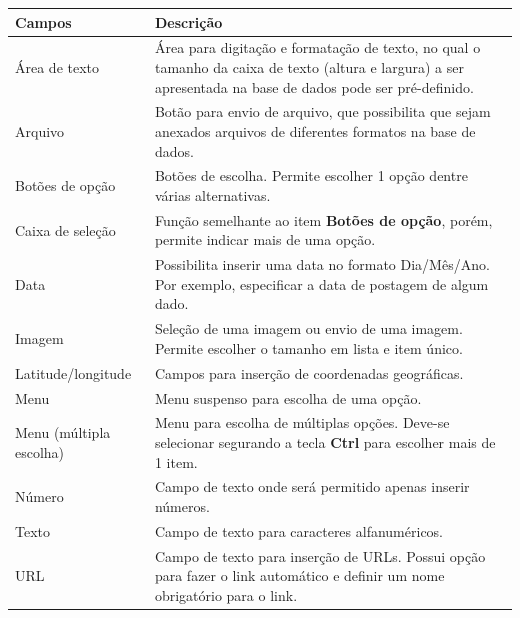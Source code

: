 \begin{longtable}{p{6cm}|p{9cm}}
   \hline
 \rowcolor[rgb]{0.8,0.8,0.8} \textbf{Campos} &  \textbf{Descrição}\\\hline
 {Área de texto} & Área para digitação e formatação de texto, no qual o tamanho da caixa de texto (altura e largura) a ser apresentada na base de dados pode ser pré-definido.\\\hline
 {Arquivo} & Botão para envio de arquivo, que possibilita que sejam anexados arquivos de diferentes formatos na base de dados.\\\hline
 {Botões de opção} & Botões de escolha. Permite escolher 1 opção dentre várias alternativas.\\\hline
 {Caixa de seleção} & Função semelhante ao item \textbf{Botões de opção}, porém, permite indicar mais de uma opção.\\\hline
 {Data} & Possibilita inserir uma data no formato Dia/Mês/Ano. Por exemplo, especificar a data de postagem de algum dado.\\\hline
 {Imagem} & Seleção de uma imagem ou envio de uma imagem. Permite escolher o tamanho em lista e item único.\\\hline
 {Latitude/longitude} & Campos para inserção de coordenadas geográficas.\\\hline
 {Menu} & Menu suspenso para escolha de uma opção.\\\hline
 {Menu (múltipla escolha)} & Menu para escolha de múltiplas opções. Deve-se selecionar segurando a tecla \textbf{Ctrl} para escolher mais de 1 item.\\\hline
 {Número} & Campo de texto onde será permitido apenas inserir números.\\\hline
 {Texto} & Campo de texto para caracteres alfanuméricos.\\\hline
 {URL} & Campo de texto para inserção de URLs. Possui opção para fazer o link automático e definir um nome obrigatório para o link.\\\hline
\end{longtable}




